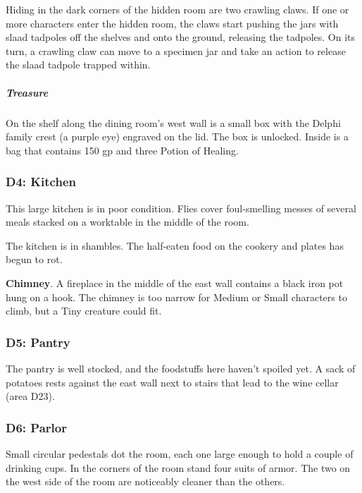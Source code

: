 \documentclass[10pt,a4paper,twoside,bg=print,twocolumn,openany,nodeprecatedcode]{dndbook}
\begin{document}
Hiding in the dark corners of the hidden room are two crawling claws. If one or more characters enter the hidden room, the claws start pushing the jars with slaad tadpoles off the shelves and onto the ground, releasing the tadpoles. On its turn, a crawling claw can move to a specimen jar and take an action to release the slaad tadpole trapped within.

\subparagraph{Treasure}
On the shelf along the dining room's west wall is a small box with the Delphi family crest (a purple eye) engraved on the lid. The box is unlocked. Inside is a bag that contains 150 gp and three Potion of Healing.

\subsubsection{D4: Kitchen}
\begin{DndReadAloud}{}
This large kitchen is in poor condition. Flies cover foul-smelling messes of several meals stacked on a worktable in the middle of the room.

\end{DndReadAloud}

The kitchen is in shambles. The half-eaten food on the cookery and plates has begun to rot.

\textbf{Chimney}. A fireplace in the middle of the east wall contains a black iron pot hung on a hook. The chimney is too narrow for Medium or Small characters to climb, but a Tiny creature could fit.

\subsubsection{D5: Pantry}
The pantry is well stocked, and the foodstuffs here haven't spoiled yet. A sack of potatoes rests against the east wall next to stairs that lead to the wine cellar (area D23).

\subsubsection{D6: Parlor}
\begin{DndReadAloud}{}
Small circular pedestals dot the room, each one large enough to hold a couple of drinking cups. In the corners of the room stand four suits of armor. The two on the west side of the room are noticeably cleaner than the others.

\end{DndReadAloud}
\end{document}

